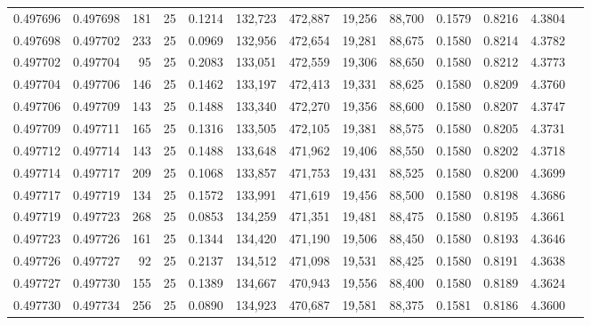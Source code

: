 \begin{tabular}{rrrrrrrrrrrrr}
0.497696 & 0.497698 & 181 &  25 &                                     0.1214 & 132,723 & 472,887 &  19,256 &  88,700 & 0.1579 & 0.8216 & 4.3804 \\
0.497698 & 0.497702 & 233 &  25 &                                     0.0969 & 132,956 & 472,654 &  19,281 &  88,675 & 0.1580 & 0.8214 & 4.3782 \\
0.497702 & 0.497704 &  95 &  25 &                                     0.2083 & 133,051 & 472,559 &  19,306 &  88,650 & 0.1580 & 0.8212 & 4.3773 \\
0.497704 & 0.497706 & 146 &  25 &                                     0.1462 & 133,197 & 472,413 &  19,331 &  88,625 & 0.1580 & 0.8209 & 4.3760 \\
0.497706 & 0.497709 & 143 &  25 &                                     0.1488 & 133,340 & 472,270 &  19,356 &  88,600 & 0.1580 & 0.8207 & 4.3747 \\
0.497709 & 0.497711 & 165 &  25 &                                     0.1316 & 133,505 & 472,105 &  19,381 &  88,575 & 0.1580 & 0.8205 & 4.3731 \\
0.497712 & 0.497714 & 143 &  25 &                                     0.1488 & 133,648 & 471,962 &  19,406 &  88,550 & 0.1580 & 0.8202 & 4.3718 \\
0.497714 & 0.497717 & 209 &  25 &                                     0.1068 & 133,857 & 471,753 &  19,431 &  88,525 & 0.1580 & 0.8200 & 4.3699 \\
0.497717 & 0.497719 & 134 &  25 &                                     0.1572 & 133,991 & 471,619 &  19,456 &  88,500 & 0.1580 & 0.8198 & 4.3686 \\
0.497719 & 0.497723 & 268 &  25 &                                     0.0853 & 134,259 & 471,351 &  19,481 &  88,475 & 0.1580 & 0.8195 & 4.3661 \\
0.497723 & 0.497726 & 161 &  25 &                                     0.1344 & 134,420 & 471,190 &  19,506 &  88,450 & 0.1580 & 0.8193 & 4.3646 \\
0.497726 & 0.497727 &  92 &  25 &                                     0.2137 & 134,512 & 471,098 &  19,531 &  88,425 & 0.1580 & 0.8191 & 4.3638 \\
0.497727 & 0.497730 & 155 &  25 &                                     0.1389 & 134,667 & 470,943 &  19,556 &  88,400 & 0.1580 & 0.8189 & 4.3624 \\
0.497730 & 0.497734 & 256 &  25 &                                     0.0890 & 134,923 & 470,687 &  19,581 &  88,375 & 0.1581 & 0.8186 & 4.3600 \\

\end{tabular}
